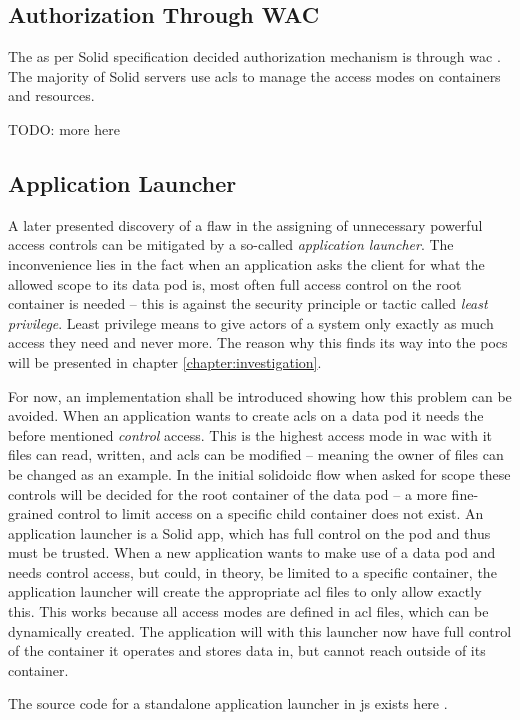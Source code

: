\subsection{Authorization Through WAC}

The as per Solid specification decided authorization mechanism is through \gls{wac} \cite{wac}. The majority of Solid servers use \glspl{acl} to manage the access modes on containers and resources.

TODO: more here

\subsection{Application Launcher}

A later presented discovery of a flaw in the assigning of unnecessary powerful access controls can be mitigated by a so-called \textit{application launcher}. The inconvenience lies in the fact when an application asks the client for what the allowed scope to its data pod is, most often full access control on the root container is needed -- this is against the security principle or tactic called \textit{least privilege}. Least privilege means to give actors of a system only exactly as much access they need and never more. The reason why this finds its way into the \glspl{poc} will be presented in chapter \ref{chapter:investigation}.

For now, an implementation shall be introduced showing how this problem can be avoided. When an application wants to create \glspl{acl} on a data pod it needs the before mentioned \textit{control} access. This is the highest access mode in \gls{wac} with it files can read, written, and \glspl{acl} can be modified -- meaning the owner of files can be changed as an example.
In the initial \gls{solidoidc} flow when asked for scope these controls will be decided for the root container of the data pod -- a more fine-grained control to limit access on a specific child container does not exist. An application launcher is a Solid app, which has full control on the pod and thus must be trusted. When a new application wants to make use of a data pod and needs control access, but could, in theory, be limited to a specific container, the application launcher will create the appropriate \gls{acl} files to only allow exactly this.
This works because all access modes are defined in \gls{acl} files, which can be dynamically created. The application will with this launcher now have full control of the container it operates and stores data in, but cannot reach outside of its container.

The source code for a standalone application launcher in \gls{js} exists here \cite{app-launcher}.
